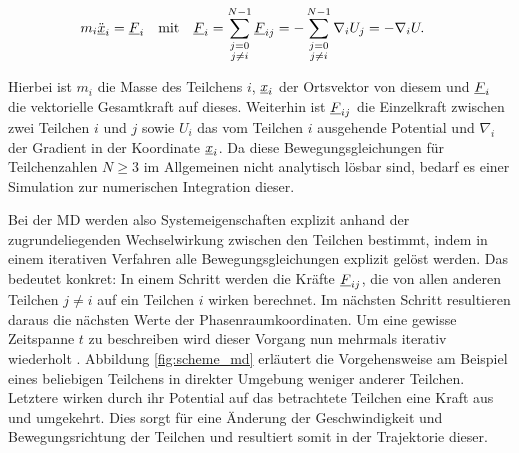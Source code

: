 		\begin{align}
			m_i \ddot{\underline{x}}_i &= \underline{F}_i
			& \text{mit} &&
			\underline{F}_{i} &= \sum_{\substack{j=0\\j \neq i}}^{N-1} \underline{F}_{ij}
			= -\sum_{\substack{j=0\\j \neq i}}^{N-1} \nabla_i U_j = -\nabla_i U
			\label{eq:newtone_dgl}
			.
		\end{align}

		Hierbei ist $m_i$ die Masse des Teilchens $i$, $\underline{x}_i$ der Ortsvektor von diesem und
		$\underline{F}_{i}$ die vektorielle Gesamtkraft auf dieses. Weiterhin ist $\underline{F}_{ij}$ die
		Einzelkraft zwischen zwei Teilchen $i$ und $j$ sowie $U_i$ das vom Teilchen $i$ ausgehende
		Potential und $\nabla_i$ der Gradient in der Koordinate $\underline{x}_i$. Da diese
		Bewegungsgleichungen für Teilchenzahlen $N \geq 3$ im Allgemeinen nicht analytisch lösbar
		sind, %
		bedarf es einer Simulation zur numerischen Integration dieser.

		Bei der MD werden also Systemeigenschaften explizit anhand der zugrundeliegenden
		Wechselwirkung zwischen den Teilchen bestimmt, indem in einem iterativen Verfahren alle
		Bewegungsgleichungen explizit gelöst werden. Das bedeutet konkret: In einem Schritt werden
		die Kräfte $\underline{F}_{ij}$, die von allen anderen Teilchen $j \neq i$ auf ein Teilchen $i$ wirken
		berechnet. Im nächsten Schritt resultieren daraus die nächsten Werte der
		Phasenraumkoordinaten. Um eine gewisse Zeitspanne $t$ zu beschreiben wird dieser Vorgang
		nun mehrmals iterativ wiederholt \cite{allen2004introduction}. Abbildung
		\ref{fig:scheme_md} erläutert die Vorgehensweise am Beispiel eines beliebigen Teilchens in
		direkter Umgebung weniger anderer Teilchen. Letztere wirken durch ihr Potential auf das
		betrachtete Teilchen eine Kraft aus und umgekehrt. Dies sorgt für eine Änderung der
		Geschwindigkeit und Bewegungsrichtung der Teilchen und resultiert somit in der Trajektorie
		dieser.

